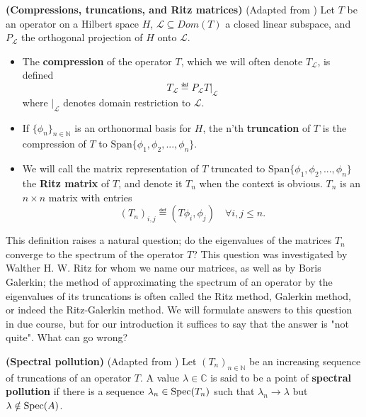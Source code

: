 \documentclass[../main.tex]{subfiles}
\begin{document}
\begin{definition}{\textbf{(Compressions, truncations, and Ritz matrices)}}
(Adapted from \parencite{davies1995spectral})
Let $T$ be an operator on a Hilbert space $H$, $\mathcal{L} \subseteq Dom(T)$ a closed linear subspace, and $P_\mathcal{L}$ the orthogonal projection
of $H$ onto $\mathcal{L}$.
\begin{itemize}
\item The \textbf{compression} of the operator $T$, which we will often denote $T_\mathcal{L}$, is defined
$$T_\mathcal{L} \eqdef P_\mathcal{L} T\big|_{\mathcal{L}}$$
where $\big|_{\mathcal{L}}$ denotes domain restriction to $\mathcal{L}$.
\item If $\{\phi_n\}_{n \in \mathbb{N}}$ is an orthonormal basis for $H$, the n'th \textbf{truncation} of $T$ is the compression of $T$ to $\text{Span}\{\phi_1, \phi_2, ..., \phi_n\}$.
\item We will call the matrix representation of $T$ truncated to $\text{Span}\{\phi_1, \phi_2, ..., \phi_n\}$ the \textbf{Ritz matrix} of $T$,
and denote it $T_n$ when the context is obvious. $T_n$ is an $n \times n$ matrix with entries
$$(T_n)_{i,j}  \eqdef (T\phi_i, \phi_j) \quad \forall i, j \leq n.$$
\end{itemize}
\end{definition}

This definition raises a natural question; do the eigenvalues of the matrices $T_n$ converge to the spectrum of the operator $T$? This question was investigated by Walther H. W. Ritz for whom we name our matrices, as well as by Boris Galerkin; the method of approximating the spectrum of an operator by the eigenvalues of its truncations is often called the Ritz method, Galerkin method, or indeed the Ritz-Galerkin method. We will formulate answers
to this question in due course, but for our introduction it suffices to say that the answer is "not quite". What can go wrong?

\begin{definition}{\textbf{(Spectral pollution)}}
(Adapted from \parencite{davies1995spectral})
Let $(T_n)_{n \in \mathbb{N}}$ be an increasing sequence of truncations of an operator $T$. A value $\lambda \in \mathbb{C}$ is said to be a point of \textbf{spectral pollution} if there is a sequence $\lambda_n \in \mathrm{Spec}(T_n)$ such that $\lambda_n \rightarrow \lambda$ but $\lambda \notin \mathrm{Spec}(A)$.
\end{definition}
\end{document}
